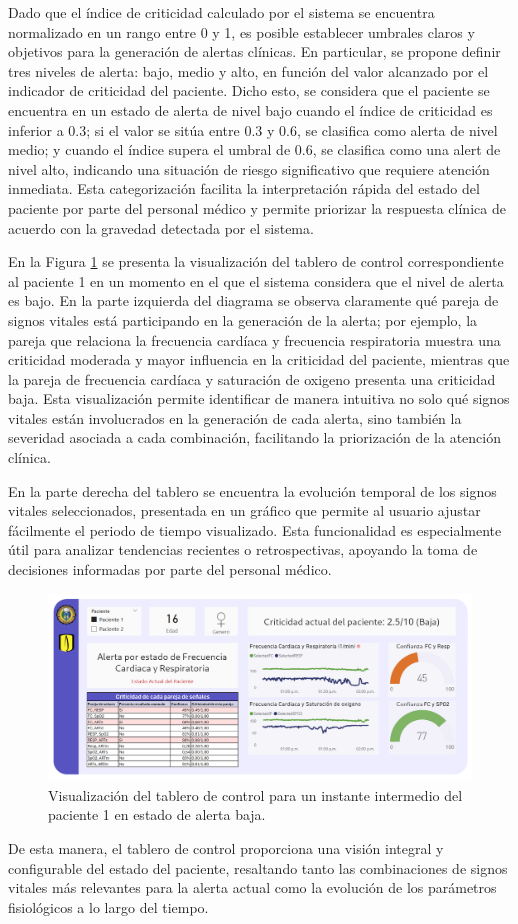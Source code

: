 Dado que el índice de criticidad calculado por el sistema se encuentra normalizado en un rango entre 0 y 1, es posible establecer umbrales claros y objetivos para la generación de alertas clínicas. En particular, se propone definir tres niveles de alerta: bajo, medio y alto, en función del valor alcanzado por el indicador de criticidad del paciente. Dicho esto, se considera que el paciente se encuentra en un estado de alerta de nivel bajo cuando el índice de criticidad es inferior a 0.3; si el valor se sitúa entre 0.3 y 0.6, se clasifica como alerta de nivel medio; y cuando el índice supera el umbral de 0.6, se clasifica como una alert de nivel alto, indicando una situación de riesgo significativo que requiere atención inmediata. Esta categorización facilita la interpretación rápida del estado del paciente por parte del personal médico y permite priorizar la respuesta clínica de acuerdo con la gravedad detectada por el sistema.

En la Figura \ref{fig:patient2_dashboard_baja_alerta} se presenta la visualización del tablero de control correspondiente al paciente 1 en un momento en el que el sistema considera que el nivel de alerta es bajo. En la parte izquierda del diagrama se observa claramente qué pareja de signos vitales está participando en la generación de la alerta; por ejemplo, la pareja que relaciona la frecuencia cardíaca y frecuencia respiratoria muestra una criticidad moderada y mayor influencia en la criticidad del paciente, mientras que la pareja de frecuencia cardíaca y saturación de oxigeno presenta una criticidad baja. Esta visualización permite identificar de manera intuitiva no solo qué signos vitales están involucrados en la generación de cada alerta, sino también la severidad asociada a cada combinación, facilitando la priorización de la atención clínica.

En la parte derecha del tablero se encuentra la evolución temporal de los signos vitales seleccionados, presentada en un gráfico que permite al usuario ajustar fácilmente el periodo de tiempo visualizado. Esta funcionalidad es especialmente útil para analizar tendencias recientes o retrospectivas, apoyando la toma de decisiones informadas por parte del personal médico.

\begin{figure}[ht] \centering \includegraphics[width=\textwidth]{Images/TableroControl2.png} \caption{Visualización del tablero de control para un instante intermedio del paciente 1 en estado de alerta baja.} \label{fig:patient2_dashboard_baja_alerta}
\end{figure}

De esta manera, el tablero de control proporciona una visión integral y configurable del estado del paciente, resaltando tanto las combinaciones de signos vitales más relevantes para la alerta actual como la evolución de los parámetros fisiológicos a lo largo del tiempo.

